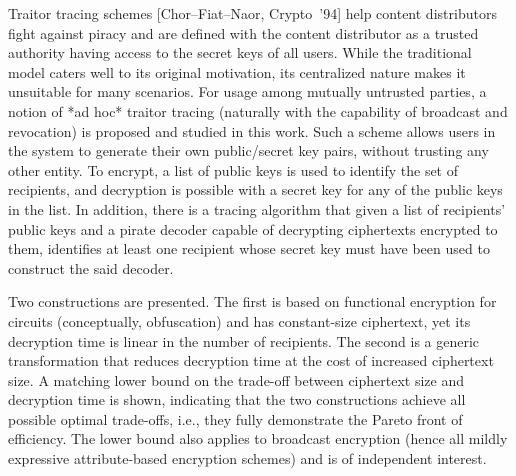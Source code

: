 \begin{textabstract}
Traitor tracing schemes [Chor–Fiat–Naor, Crypto ’94] help content distributors fight against piracy and are defined with the content distributor as a trusted authority having access to the secret keys of all users.  While the traditional model caters well to its original motivation, its centralized nature makes it unsuitable for many scenarios.  For usage among mutually untrusted parties, a notion of *ad hoc* traitor tracing (naturally with the capability of broadcast and revocation) is proposed and studied in this work.  Such a scheme allows users in the system to generate their own public/secret key pairs, without trusting any other entity.  To encrypt, a list of public keys is used to identify the set of recipients, and decryption is possible with a secret key for any of the public keys in the list.  In addition, there is a tracing algorithm that given a list of recipients’ public keys and a pirate decoder capable of decrypting ciphertexts encrypted to them, identifies at least one recipient whose secret key must have been used to construct the said decoder.

Two constructions are presented.  The first is based on functional encryption for circuits (conceptually, obfuscation) and has constant-size ciphertext, yet its decryption time is linear in the number of recipients.  The second is a generic transformation that reduces decryption time at the cost of increased ciphertext size.  A matching lower bound on the trade-off between ciphertext size and decryption time is shown, indicating that the two constructions achieve all possible optimal trade-offs, i.e., they fully demonstrate the Pareto front of efficiency.  The lower bound also applies to broadcast encryption (hence all mildly expressive attribute-based encryption schemes) and is of independent interest.
\end{textabstract}
